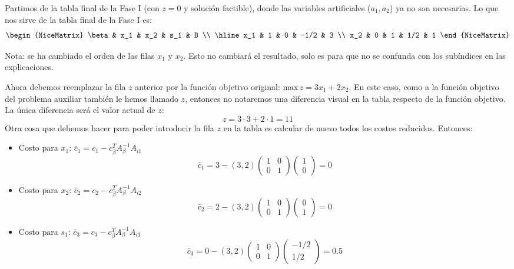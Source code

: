 Partimos de la tabla final de la Fase I (con \(z = 0\) y solución factible), donde las variables artificiales (\(a_1, a_2\)) ya no son necesarias. Lo que nos sirve de la tabla final de la Fase I es:
\[
  \begin{NiceMatrix}
    \beta & x_1 & x_2 & s_1 & B \\
    \hline
    x_1 & 1 & 0 & -1/2 & 3 \\
    x_2 & 0 & 1 & 1/2 & 1
  \end{NiceMatrix}
\]
\begin{tcolorbox}[myconclusion]
  Nota: se ha cambiado el orden de las filas \(x_1\) y \(x_2\). Esto no cambiará el resultado, solo es para que no se confunda con los subíndices en las explicaciones.
\end{tcolorbox}
Ahora debemos reemplazar la fila \(z\) anterior por la función objetivo original: \(\text{max}\, z=3x_1+2x_2\). En este caso, como a la función objetivo del problema auxiliar también le hemos llamado \(z\), entonces no notaremos una diferencia visual en la tabla respecto de la función objetivo. La única diferencia será el valor actual de \(z\):
\[
  z = 3 \cdot 3 + 2 \cdot 1 = 11
\]
Otra cosa que debemos hacer para poder introducir la fila \(z\) en la tabla es calcular de nuevo todos los costos reducidos. Entonces:
\begin{itemize}
  \item Costo para \(x_1\): \(\bar{c}_1 = c_1 - c_\beta ^T A_\beta^{-1}A_{i1}\)
  \[
    \bar{c}_1 = 3 - (3, 2)\begin{pmatrix}
      1 & 0 \\
      0 & 1
    \end{pmatrix} \begin{pmatrix}
      1 \\ 0
    \end{pmatrix} = 0
  \]
  \item Costo para \(x_2\): \(\bar{c}_2 = c_2 - c_\beta ^T A_\beta^{-1}A_{i2}\)
  \[
    \bar{c}_2 = 2 - (3, 2)\begin{pmatrix}
      1 & 0 \\
      0 & 1
    \end{pmatrix} \begin{pmatrix}
      0 \\ 1
    \end{pmatrix} = 0
  \]
  \item Costo para \(s_1\): \(\bar{c}_3 = c_3 - c_\beta ^T A_\beta^{-1}A_{i3}\)
  \[
    \bar{c}_3 = 0 - (3, 2)\begin{pmatrix}
      1 & 0 \\
      0 & 1
    \end{pmatrix} \begin{pmatrix}
      -1/2 \\ 1/2
    \end{pmatrix} = 0.5
  \]
\end{itemize}
